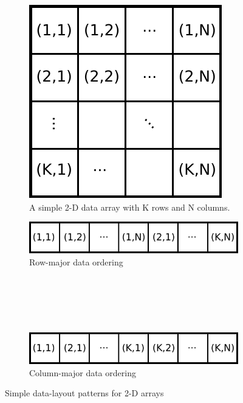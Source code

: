 \documentclass[12pt,number,sort&compress,preprint]{elsarticle}
\newcommand{\addnl}[1]{{\sloppy\textcolor{OliveGreen}{#1}}}  %
\begin{document}
\begin{figure}[htb]
  \centering
  \begin{minipage}{0.45\linewidth}
    \begin{subfigure}[t]{\textwidth}
      \includegraphics[width=\textwidth]{data_layouts.pdf}
      \caption{A simple 2-D data array with K rows and N columns.}
      \label{F:mem}
    \end{subfigure}
  \end{minipage}
  \hfil
  \begin{minipage}{0.45\linewidth}
    \begin{subfigure}[t]{\textwidth}
	\includegraphics[width=\textwidth]{row_major.pdf}
	\caption{Row-major data ordering}
	\label{F:row_major}
    \end{subfigure}
    \\
    \\
    \\
    \\
    \begin{subfigure}[t]{\textwidth}
	\includegraphics[width=\textwidth]{column_major.pdf}
	\caption{Column-major data ordering}
	\label{F:column_major}
    \end{subfigure}
  \end{minipage}
  \caption{\addnl{Simple data-layout patterns for 2-D arrays}}
\end{figure}
\end{document}
